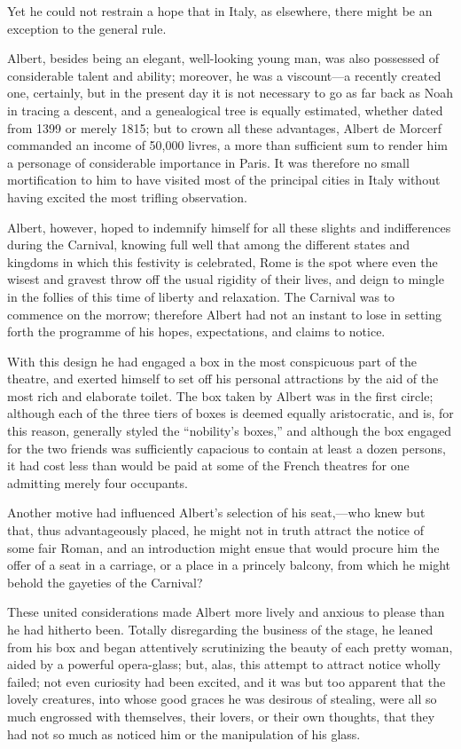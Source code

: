 Yet he could not restrain a hope that in Italy, as elsewhere, there
might be an exception to the general rule.

Albert, besides being an elegant, well-looking young man, was also
possessed of considerable talent and ability; moreover, he was a
viscount—a recently created one, certainly, but in the present day it
is not necessary to go as far back as Noah in tracing a descent, and a
genealogical tree is equally estimated, whether dated from 1399 or
merely 1815; but to crown all these advantages, Albert de Morcerf
commanded an income of 50,000 livres, a more than sufficient sum to
render him a personage of considerable importance in Paris. It was
therefore no small mortification to him to have visited most of the
principal cities in Italy without having excited the most trifling
observation.

Albert, however, hoped to indemnify himself for all these slights and
indifferences during the Carnival, knowing full well that among the
different states and kingdoms in which this festivity is celebrated,
Rome is the spot where even the wisest and gravest throw off the usual
rigidity of their lives, and deign to mingle in the follies of this
time of liberty and relaxation. The Carnival was to commence on the
morrow; therefore Albert had not an instant to lose in setting forth
the programme of his hopes, expectations, and claims to notice.

With this design he had engaged a box in the most conspicuous part of
the theatre, and exerted himself to set off his personal attractions by
the aid of the most rich and elaborate toilet. The box taken by Albert
was in the first circle; although each of the three tiers of boxes is
deemed equally aristocratic, and is, for this reason, generally styled
the “nobility’s boxes,” and although the box engaged for the two
friends was sufficiently capacious to contain at least a dozen persons,
it had cost less than would be paid at some of the French theatres for
one admitting merely four occupants.

Another motive had influenced Albert’s selection of his seat,—who knew
but that, thus advantageously placed, he might not in truth attract the
notice of some fair Roman, and an introduction might ensue that would
procure him the offer of a seat in a carriage, or a place in a princely
balcony, from which he might behold the gayeties of the Carnival?

These united considerations made Albert more lively and anxious to
please than he had hitherto been. Totally disregarding the business of
the stage, he leaned from his box and began attentively scrutinizing
the beauty of each pretty woman, aided by a powerful opera-glass; but,
alas, this attempt to attract notice wholly failed; not even curiosity
had been excited, and it was but too apparent that the lovely
creatures, into whose good graces he was desirous of stealing, were all
so much engrossed with themselves, their lovers, or their own thoughts,
that they had not so much as noticed him or the manipulation of his
glass.

